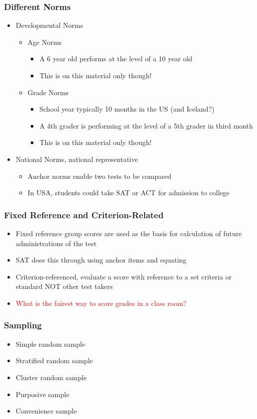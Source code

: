 \documentclass[dvipsnames]{beamer}\usepackage[]{graphicx}\usepackage[]{color}
\begin{document}
\begin{frame}
\frametitle{Different Norms}
\begin{itemize}
\item Developmental Norms
  \begin{itemize}
  \item Age Norms
    \begin{itemize}
    \item A 6 year old performs at the level of a 10 year old
    \item This is on this material only though! 
    \end{itemize}
  \item Grade Norms
    \begin{itemize}
    \item School year typically 10 months in the US (and Iceland?)
    \item A 4th grader is performing at the level of a 5th grader in third month
    \item This is on this material only though!
    \end{itemize}
  \end{itemize}
\item National Norms, national representative
  \begin{itemize}
  \item Anchor norms enable two tests to be compared
  \item In USA, students could take SAT or ACT for admission to college
  \end{itemize}
\end{itemize}
\end{frame}

\begin{frame}
\frametitle{Fixed Reference and Criterion-Related}
\begin{itemize}
\item Fixed reference group scores are used as the basis for calculation of future administrations of the test
\item SAT does this through using anchor items and equating
\item Criterion-referenced, evaluate a score with reference to a set criteria or standard NOT other test takers
\item \textcolor{red}{What is the fairest way to score grades in a class room?}
\end{itemize}
\end{frame}

\begin{frame}
\frametitle{Sampling}
\begin{itemize}
\item Simple random sample
\item Stratified random sample
\item Cluster random sample
\item Purposive sample
\item Convenience sample
\end{itemize}
\end{frame}
\end{document}
